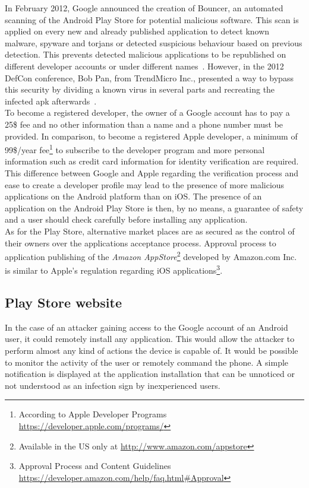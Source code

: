 In February 2012, Google announced the creation of Bouncer, an automated scanning of the Android Play Store for potential malicious software.
This scan is applied on every new and already published application to detect known malware, spyware and torjans or detected suspicious behaviour based on previous detection.
This prevents detected malicious applications to be republished on different developer accounts or under different names~\cite{secu-bouncer}.
However, in the 2012 DefCon conference, Bob Pan, from TrendMicro Inc., presented a way to bypass this security by dividing a known virus in several parts and recreating the infected apk afterwards~\cite{secu-defcon}.\\

To become a registered developer, the owner of a Google account has to pay a 25\$ fee and no other information than a name and a phone number must be provided.
In comparison, to become a registered Apple developer, a minimum of 99\$/year fee\footnote{According to Apple Developer Programs \url{https://developer.apple.com/programs/}} to subscribe to the developer program and more personal information such as credit card information for identity verification are required.\\

This difference between Google and Apple regarding the verification process and ease to create a developer profile  may lead to the presence of more malicious applications on the Android platform than on iOS.
The presence of an application on the Android Play Store is then, by no means, a guarantee of safety and a user should check carefully before installing any application.\\

As for the Play Store, alternative market places are as secured as the control of their owners over the applications acceptance process.
Approval process to application publishing of the \emph{Amazon AppStore}\footnote{Available in the US only at \url{http://www.amazon.com/appstore}} developed by Amazon.com Inc. is  similar to Apple's regulation regarding iOS applications\footnote{Approval Process and Content Guidelines \url{https://developer.amazon.com/help/faq.html\#Approval}}.

\subsection{Play Store website}

In the case of an attacker gaining access to the Google account of an Android user, it could remotely install any application.
This would allow the attacker to perform almost any kind of actions the device is capable of.
It would be possible to monitor the activity of the user or remotely command the phone.
A simple notification is displayed at the application installation that can be unnoticed or not understood as an infection sign by inexperienced users.

